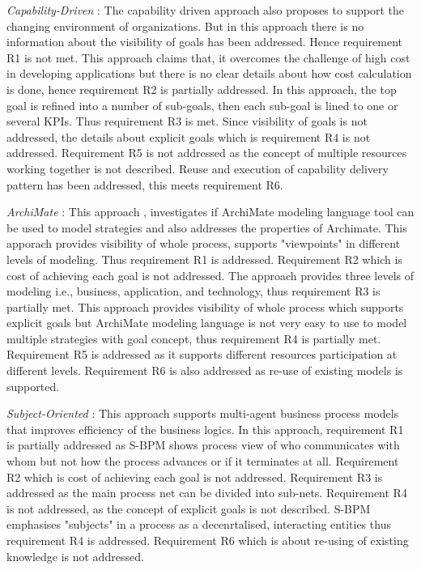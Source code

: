 \textit{Capability-Driven} :  The capability driven approach \cite{Stirna2012} also proposes to support the changing environment of organizations. But in this approach there is no information about the visibility of goals has been addressed. Hence requirement R1 is not met. This approach claims that, it overcomes the challenge of high cost in developing applications but there is no clear details about how cost calculation is done, hence requirement R2 is partially addressed. In this approach, the top goal is refined into a number of sub-goals, then each sub-goal is lined to one or several KPIs. Thus requirement R3 is met. Since visibility of goals is not addressed, the details about explicit goals which is requirement R4 is not addressed. Requirement R5 is not addressed as the concept of multiple resources working together is not described. Reuse and execution of capability delivery pattern has been addressed, this meets requirement R6. 

\textit{ArchiMate} : This approach \cite{Aldea2015}, investigates if ArchiMate modeling language tool can be used to model strategies and also addresses the properties of Archimate. This apporach provides visibility of whole process, supports "viewpoints" in different levels of modeling. Thus requirement R1 is addressed. Requirement R2 which is cost of achieving each goal is not addressed. The approach provides three levels of modeling i.e., business, application, and technology, thus requirement R3 is partially met. This approach provides visibility of whole process which supports explicit goals but ArchiMate modeling language is not very easy to use to model multiple strategies with goal concept, thus requirement R4 is partially met. Requirement R5 is addressed as it supports different resources participation at different levels. Requirement R6 is also addressed as re-use of existing models is supported. 

\textit{Subject-Oriented} : This approach \cite{Fleischmann2013} supports multi-agent business process models that improves efficiency of the business logics. In this approach, requirement R1 is partially addressed  as S-BPM shows process view of who communicates with whom
but not how the process advances or if it terminates at all. Requirement R2 which is cost of achieving each goal is not addressed. Requirement R3 is addressed as the main process net can be divided into sub-nets. Requirement R4 is not addressed, as  the concept of explicit goals is not described. S-BPM emphasises "subjects" in a process as a decenrtalised, interacting entities thus requirement R4 is addressed. Requirement R6 which is about re-using of existing knowledge is not addressed. 

